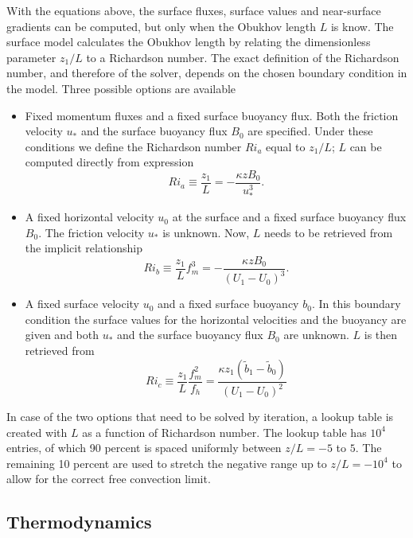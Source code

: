 \documentclass[gmd]{copernicus}
\begin{document}
With the equations above, the surface fluxes, surface values and near-surface gradients can be computed, but only when the Obukhov length $L$ is know. The surface model calculates the Obukhov length by relating the dimensionless parameter $z_1/ L$ to a Richardson number. The exact definition of the Richardson number, and therefore of the solver, depends on the chosen boundary condition in the model. Three possible options are available
\begin{itemize}
	\item Fixed momentum fluxes and a fixed surface buoyancy flux. Both the friction velocity $u_*$ and the surface buoyancy flux $B_0$ are specified. Under these conditions we define the Richardson number $Ri_a$ equal to $z_1/L$; $L$ can be computed directly from expression
	\begin{equation}
	Ri_a \equiv \dfrac{z_1}{L} = - \dfrac{\kappa z B_0}{u_*^3}.
	\end{equation}
	\item A fixed horizontal velocity $u_0$ at the surface and a fixed surface buoyancy flux $B_0$. The friction velocity $u_*$ is unknown. Now,  $L$ needs to be retrieved from the implicit relationship 
	\begin{equation}
	Ri_b \equiv \dfrac{z_1}{L} f_m^3 = - \dfrac{\kappa z B_0}{ \left(U_1 - U_0 \right)^3}.
	\end{equation}
	\item A fixed surface velocity $u_0$ and a fixed surface buoyancy $b_0$. In this boundary condition the surface values for the horizontal velocities and the buoyancy are given and both $u_*$ and the surface buoyancy flux $B_0$ are unknown. $L$ is then retrieved from
	\begin{equation}
	Ri_c \equiv \dfrac{z_1}{L} \dfrac{f_m^2}{f_h} = \dfrac{\kappa z_1 \left(\widetilde{b}_1 - \widetilde{b}_0 \right)}{ \left(U_1 - U_0 \right)^2}
	\end{equation}
\end{itemize}
In case of the two options that need to be solved by iteration, a lookup table is created  with $L$ as a function of Richardson number. The lookup table has $10^4$ entries, of which 90 percent is spaced uniformly between $z/L = -5$ to $5$. The remaining 10 percent are used to stretch the negative range up to $z/L = -10^4$ to allow for the correct free convection limit.

\subsection{Thermodynamics}
\end{document}
